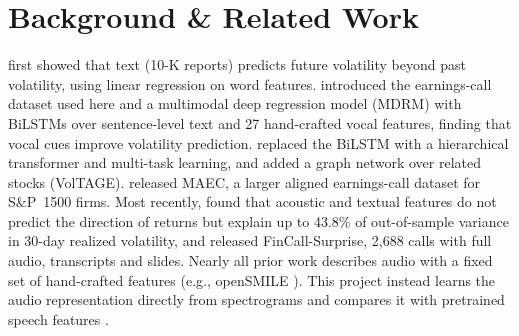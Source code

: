 \documentclass[final]{article}
\begin{document}
\vspace{-0.1in}
\section*{Background \& Related Work}
\citet{kogan2009predicting} first showed that text (10-K reports) predicts future volatility beyond
past volatility, using linear regression on word features. \citet{qin2019what} introduced the
earnings-call dataset used here and a multimodal deep regression model (MDRM) with BiLSTMs over
sentence-level text and 27 hand-crafted vocal features, finding that vocal cues improve volatility
prediction. \citet{yang2020html} replaced the BiLSTM with a hierarchical transformer and multi-task
learning, and \citet{sawhney2020voltage} added a graph network over related stocks (VolTAGE).
\citet{li2020maec} released MAEC, a larger aligned earnings-call dataset for S\&P~1500 firms.
Most recently, \citet{chen2025sound} found that acoustic and textual features do not predict the
direction of returns but explain up to 43.8\% of out-of-sample variance in 30-day realized volatility, and
\citet{shu2026fincall} released FinCall-Surprise, 2,688 calls with full audio, transcripts and slides.
Nearly all prior work describes audio with a fixed set of hand-crafted features (e.g., openSMILE
\citep{eyben2010opensmile}). This project instead learns the audio representation directly from
spectrograms and compares it with pretrained speech features \citep{baevski2020wav2vec}.
\end{document}
